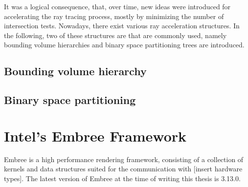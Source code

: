 It was a logical consequence, that, over time, new ideas were introduced for accelerating the ray tracing process, mostly by minimizing the number of intersection tests. Nowadays, there exist various ray acceleration structures. In the following, two of these structures are that are commonly used, namely bounding volume hierarchies and binary space partitioning trees are introduced.

\subsection{Bounding volume hierarchy}

\subsection{Binary space partitioning}


\section{Intel\textregistered's Embree Framework}
Embree is a high performance rendering framework, consisting of a collection of kernels and data structures suited for the communication with [insert hardware types]. The latest version of Embree at the time of writing this thesis is 3.13.0.